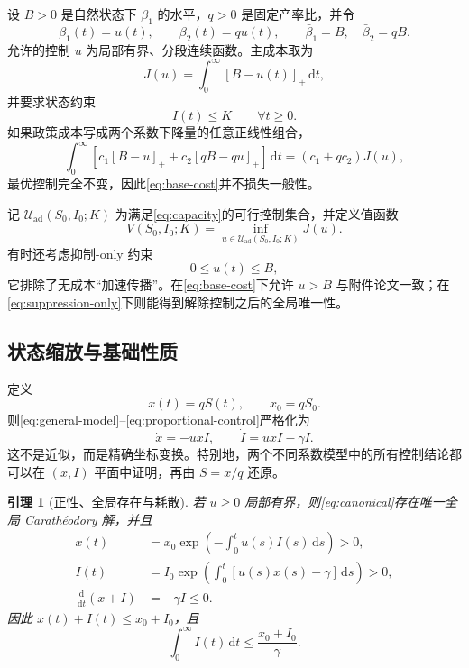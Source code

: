 \documentclass[11pt,a4paper,UTF8]{ctexart}
\newtheorem{lemma}[theorem]{引理}
\theoremstyle{definition}
\newcommand{\Uad}{\mathcal{U}_{\mathrm{ad}}}
\newcommand{\pos}[1]{\left[#1\right]_{+}}
\newcommand{\dd}{\,\mathrm{d}}
\begin{document}
设 $B>0$ 是自然状态下 $\beta_1$ 的水平，$q>0$ 是固定产率比，并令
\begin{equation}
\beta_1(t)=u(t),\qquad \beta_2(t)=q u(t),\qquad
\bar\beta_1=B,\quad \bar\beta_2=qB.
\label{eq:proportional-control}
\end{equation}
允许的控制 $u$ 为局部有界、分段连续函数。主成本取为
\begin{equation}
J(u)=\int_0^\infty \pos{B-u(t)}\dd t,
\label{eq:base-cost}
\end{equation}
并要求状态约束
\begin{equation}
I(t)\le K\qquad \forall t\ge0.
\label{eq:capacity}
\end{equation}
如果政策成本写成两个系数下降量的任意正线性组合，
\[
\int_0^\infty\left[c_1\pos{B-u}+c_2\pos{qB-qu}\right]\dd t
=(c_1+qc_2)J(u),
\]
最优控制完全不变，因此\eqref{eq:base-cost}并不损失一般性。

记 $\Uad(S_0,I_0;K)$ 为满足\eqref{eq:capacity}的可行控制集合，并定义值函数
\begin{equation}
V(S_0,I_0;K)=\inf_{u\in\Uad(S_0,I_0;K)}J(u).
\label{eq:value-def}
\end{equation}
有时还考虑抑制-only 约束
\begin{equation}
0\le u(t)\le B,
\label{eq:suppression-only}
\end{equation}
它排除了无成本“加速传播”。在\eqref{eq:base-cost}下允许 $u>B$ 与附件论文一致；在\eqref{eq:suppression-only}下则能得到解除控制之后的全局唯一性。

\subsection{状态缩放与基础性质}

定义
\begin{equation}
x(t)=qS(t),\qquad x_0=qS_0.
\label{eq:x-transform}
\end{equation}
则\eqref{eq:general-model}--\eqref{eq:proportional-control}严格化为
\begin{equation}
\dot x=-u xI,\qquad \dot I=u xI-\gamma I.
\label{eq:canonical}
\end{equation}
这不是近似，而是精确坐标变换。特别地，两个不同系数模型中的所有控制结论都可以在 $(x,I)$ 平面中证明，再由 $S=x/q$ 还原。

\begin{lemma}[正性、全局存在与耗散]
若 $u\ge0$ 局部有界，则\eqref{eq:canonical}存在唯一全局 Carath\'eodory 解，并且
\begin{equation}
\begin{aligned}
x(t)&=x_0\exp\left(-\int_0^t u(s)I(s)\dd s\right)>0,\\
I(t)&=I_0\exp\left(\int_0^t[u(s)x(s)-\gamma]\dd s\right)>0,\\
\frac{\dd}{\dd t}(x+I)&=-\gamma I\le0.
\end{aligned}
\label{eq:positivity-identities}
\end{equation}
因此 $x(t)+I(t)\le x_0+I_0$，且
\begin{equation}
\int_0^\infty I(t)\dd t\le \frac{x_0+I_0}{\gamma}.
\label{eq:I-integrable-bound}
\end{equation}
\end{lemma}
\end{document}
